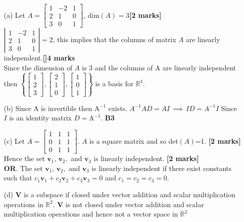 \documentclass[12pt]{exam}
\newcommand{\vv}{\mathbf{v}}
\newcommand{\vV}{\mathbf{V}}
\begin{document}
\begin{questions}
\begin{solution}
	\begin{enumerate}
		\item[(a)] Let $A=\begin{bmatrix}
		1&-2&1\\
		2&1&0\\
		3&0&1
		\end{bmatrix}$, 
$\text{dim}(A)=3$\hfill \textbf{[2 marks]}\\
$\left|\begin{matrix}
1&-2&1\\
2&1&0\\
3&0&1
\end{matrix} \right| =2$, this implies that the columns of matrix $A$ are linearly independent.\hfill \textbf{[]4 marks}\\
Since the dimension of $A$ is 3 and the columns of A are linearly independent then $\left\{\begin{bmatrix}
1\\
2\\
3
\end{bmatrix},
\begin{bmatrix}
2\\
1\\
0
\end{bmatrix},
\begin{bmatrix}
1\\
0\\
1
\end{bmatrix}\right\}$ is a basis for $\mathbb{R}^3$. 
		\item[(b)] Since A is invertible then $\mathrm{A}^{-1}$ exists. $A^{-1}AD = AI \, \implies \,  ID = A^{-1}I$ Since $I$ is an identity matrix $D=\mathrm{A}^{-1}$. \hfill \textbf{B3}
		\item[(c)]  Let $A =\begin{bmatrix}
1 & 1 & 1\\
0 & 1 & 1\\
0 & 1 & 1\end{bmatrix}$. $A$ is a square matrix and so det$(A)$=1. \hfill\textbf{[2 marks]}\\
Hence the set $\vv_1,\, \vv_2,$ and $ \vv_3$ is linearly independent. \hfill\textbf{[2 marks]}\\
\textbf{OR}. The set $\vv_1,\, \vv_2,$ and $ \vv_3$ is linearly independent if there exist constants such that $c_1\vv_1+c_2\vv_2+c_3\vv_3=0$ and $c_1=c_2=c_3=0.$
		\item[(d)] $\vV$ is a subspace if closed under vector addition and scalar multiplication operations in $\mathbb{R}^2$. $\vV$ is not closed under vector addition and scalar multiplication operations and hence not a vector space in $\mathbb{R}^2$
\end{enumerate}
\end{solution}


\end{questions}
\end{document}
